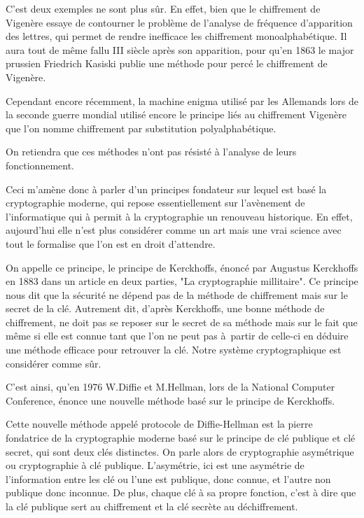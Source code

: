 C'est deux exemples ne sont plus sûr. En effet, bien que le chiffrement de Vigenère essaye de
contourner le problème de l'analyse de fréquence d'apparition des lettres, qui permet de rendre
inefficace les chiffrement monoalphabétique. Il aura tout de
même fallu III
siècle après son apparition, pour qu'en 1863 le major prussien Friedrich Kasiski publie une
méthode pour percé le chiffrement de Vigenère.

Cependant encore récemment, la machine enigma utilisé par les Allemands lors de la seconde
guerre mondial utilisé encore le principe liés au chiffrement Vigenère que l'on nomme chiffrement
par substitution polyalphabétique.

On retiendra que ces méthodes n'ont pas résisté à l'analyse de leurs
fonctionnement.

Ceci m'amène donc à parler d'un principes fondateur sur lequel est basé la cryptographie
moderne, qui repose essentiellement sur l'avènement de l'informatique qui à permit à la
cryptographie un renouveau historique. En effet, aujourd'hui elle n'est plus considérer comme
un art mais une vrai science avec tout le formalise que l'on est en droit d'attendre.

On appelle ce principe, le principe de Kerckhoffs, énoncé par Augustus Kerckhoffs en 1883 dans
un article en deux parties, "La cryptographie millitaire". Ce principe nous dit que la sécurité
ne dépend pas de la méthode de chiffrement mais sur le secret de la clé. Autrement dit, d'après
Kerckhoffs, une bonne méthode de chiffrement, ne doit pas se reposer sur le secret de sa
méthode mais sur le fait que même si elle est connue tant que l'on ne peut pas à partir de
celle-ci en déduire une méthode efficace pour retrouver la clé. Notre système
cryptographique est considérer comme sûr. 

C'est ainsi, qu'en 1976 W.Diffie et M.Hellman, lors de la National Computer Conference,
énonce une nouvelle méthode basé sur le principe de Kerckhoffs. 

Cette nouvelle méthode appelé protocole de Diffie-Hellman est la pierre fondatrice de la cryptographie moderne basé sur le
principe de clé publique et clé secret, qui sont deux clés distinctes. On parle alors de cryptographie asymétrique ou
cryptographie à clé publique.
L'asymétrie, ici est une asymétrie de l'information entre les clé ou l'une est publique, donc
connue, et l'autre non publique donc inconnue. De plus, chaque clé à sa propre fonction,
c'est à dire que la clé publique sert au chiffrement et la clé secrète au déchiffrement.

